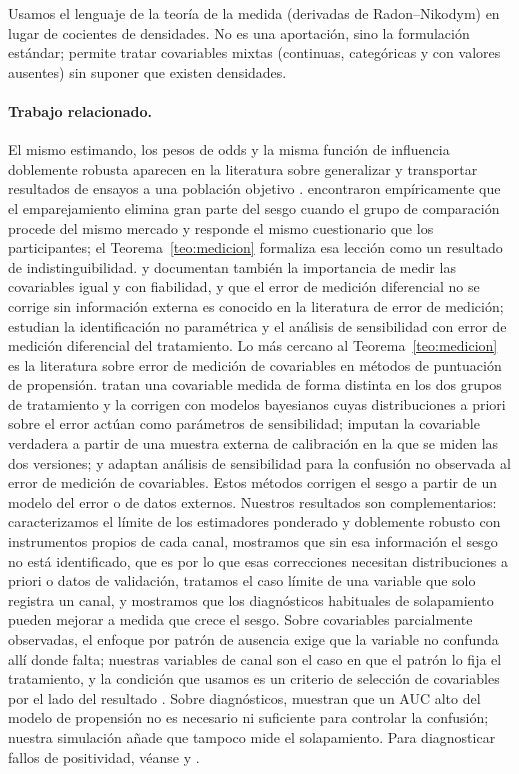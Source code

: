 Usamos el lenguaje de la teoría de la medida (derivadas de Radon--Nikodym) en lugar de cocientes de densidades. No es una aportación, sino la formulación estándar; permite tratar covariables mixtas (continuas, categóricas y con valores ausentes) sin suponer que existen densidades.

\paragraph{Trabajo relacionado.} El mismo estimando, los pesos de odds y la misma función de influencia doblemente robusta aparecen en la literatura sobre generalizar y transportar resultados de ensayos a una población objetivo \citep{westreich2017,dahabreh2019}. \citet{heckman1997} encontraron empíricamente que el emparejamiento elimina gran parte del sesgo cuando el grupo de comparación procede del mismo mercado y responde el mismo cuestionario que los participantes; el Teorema~\ref{teo:medicion} formaliza esa lección como un resultado de indistinguibilidad. \citet{cook2008} y \citet{steiner2011} documentan también la importancia de medir las covariables igual y con fiabilidad, y que el error de medición diferencial no se corrige sin información externa es conocido en la literatura de error de medición; \citet{imai2010} estudian la identificación no paramétrica y el análisis de sensibilidad con error de medición diferencial del tratamiento. Lo más cercano al Teorema~\ref{teo:medicion} es la literatura sobre error de medición de covariables en métodos de puntuación de propensión. \citet{hong2017} tratan una covariable medida de forma distinta en los dos grupos de tratamiento y la corrigen con modelos bayesianos cuyas distribuciones a priori sobre el error actúan como parámetros de sensibilidad; \citet{webbvargas2017} imputan la covariable verdadera a partir de una muestra externa de calibración en la que se miden las dos versiones; y \citet{rudolph2016} adaptan análisis de sensibilidad para la confusión no observada al error de medición de covariables. Estos métodos corrigen el sesgo a partir de un modelo del error o de datos externos. Nuestros resultados son complementarios: caracterizamos el límite de los estimadores ponderado y doblemente robusto con instrumentos propios de cada canal, mostramos que sin esa información el sesgo no está identificado, que es por lo que esas correcciones necesitan distribuciones a priori o datos de validación, tratamos el caso límite de una variable que solo registra un canal, y mostramos que los diagnósticos habituales de solapamiento pueden mejorar a medida que crece el sesgo. Sobre covariables parcialmente observadas, el enfoque por patrón de ausencia \citep{dagostino2000,blake2020} exige que la variable no confunda allí donde falta; nuestras variables de canal son el caso en que el patrón lo fija el tratamiento, y la condición que usamos es un criterio de selección de covariables por el lado del resultado \citep{deluna2011,vanderweele2011}. Sobre diagnósticos, \citet{westreich2011} muestran que un AUC alto del modelo de propensión no es necesario ni suficiente para controlar la confusión; nuestra simulación añade que tampoco mide el solapamiento. Para diagnosticar fallos de positividad, véanse \citet{petersen2012} y \citet{damour2021}. 